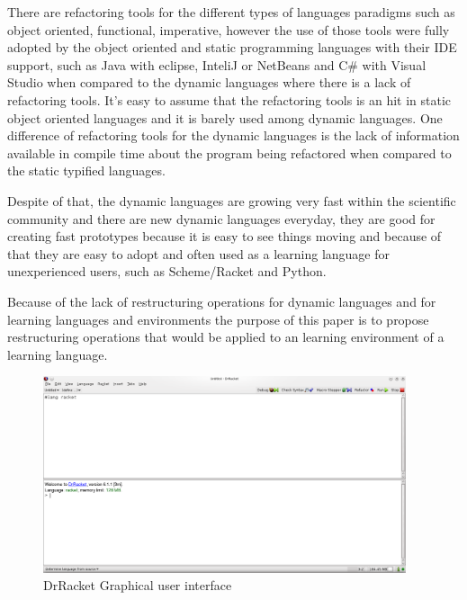 There are refactoring tools for the different types of languages paradigms such as object oriented, functional, imperative, however the use of those tools were fully adopted by the object oriented and static programming languages with their IDE support, such as Java with eclipse, InteliJ or NetBeans and C# with Visual Studio when %
compared to the dynamic languages where there is a lack of refactoring tools. It's easy to assume that the refactoring tools is an hit in static object oriented languages and it is barely used among dynamic languages. 
One difference of refactoring tools for the dynamic languages is the lack of information available in compile time about the program being refactored when compared to the static typified languages.

Despite of that, the dynamic languages are growing very fast within the scientific community and there are new dynamic languages everyday, they are good for creating fast prototypes because it is easy to see things moving and because of that they are easy to adopt and often used as a learning language for unexperienced users, such as Scheme/Racket and Python. %


Because of the lack of restructuring operations for dynamic languages and for learning languages and environments the purpose of this paper is to propose restructuring operations that would be applied to an learning environment of a learning language. %


\begin{figure}[htbp]
	\centering
	\includegraphics[width=0.95\textwidth]{img/DrRacketGui.png}
	\caption{DrRacket Graphical user interface}
	\label{fig:DrRacketGui}
\end{figure}

